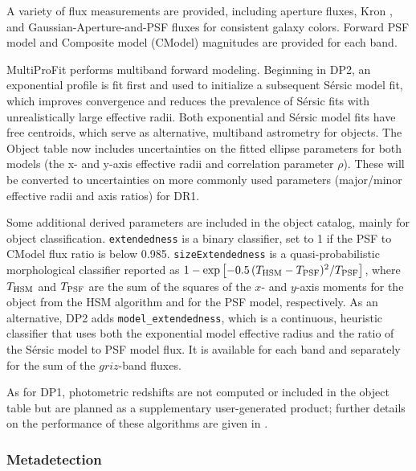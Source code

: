 A variety of flux measurements are provided, including aperture fluxes, Kron \citep[][]{1980ApJS...43..305K}, and Gaussian-Aperture-and-PSF \citep[\gls{GAaP};][]{2008A&A...482.1053K, DMTN-190} fluxes for consistent galaxy colors.
Forward \gls{PSF} model and Composite model (CModel) magnitudes \citep[][]{2004AJ....128..502A, 2018PASJ...70S...5B} are provided for each band.

\gls{MultiProFit} \citep[][]{DMTN-312} performs multiband forward modeling.
Beginning in DP2, an \gls{exponential profile} is fit first and used to initialize a subsequent S\'ersic model \citep[][]{1963BAAA....6...41S, 1968adga.book.....S} fit, which improves convergence and reduces the prevalence of S\'ersic fits with unrealistically large effective radii.
Both exponential and S\'ersic model fits have free centroids, which serve as alternative, multiband \gls{astrometry} for objects.
The \gls{Object} table now includes uncertainties on the fitted ellipse parameters for both models (the x- and y-axis effective radii and correlation parameter $\rho$).
These will be converted to uncertainties on more commonly used parameters (major/minor effective radii and axis ratios) for \gls{DR1}.

Some additional derived parameters are included in the object catalog, mainly for object classification.
\texttt{extendedness} is a binary classifier, set to 1 if the \gls{PSF} to CModel \gls{flux} ratio is below 0.985.
\texttt{sizeExtendedness} is a quasi-probabilistic morphological classifier reported as $1 - \exp\left[-0.5\,(T_{\rm HSM} - T_{\rm PSF})^2/T_{\rm PSF}\right]$, where $T_{\rm HSM}$ and $T_{\rm PSF}$ are the sum of the squares of the $x$- and $y$-axis moments for the object from the \gls{HSM} \gls{algorithm} and for the \gls{PSF} model, respectively.
As an alternative, \gls{DP2} adds \texttt{model\_extendedness}, which is a continuous, heuristic classifier that uses both the exponential model effective radius and the ratio of the S\'ersic model to \gls{PSF} model flux.
It is available for each band and separately for the sum of the $griz$-band fluxes.

As for \gls{DP1}, photometric redshifts are not computed or included in the object table but are planned as a supplementary user-generated product; further details on the performance of these algorithms are given in .

\subsubsection{Metadetection} \label{sec:drp-multivisit-shearobject}

